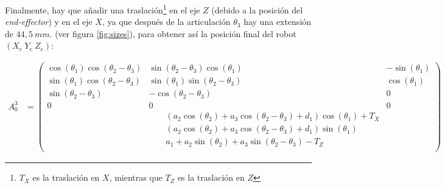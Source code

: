 \documentclass[a4paper,12pt]{article}
\begin{document}
Finalmente, hay que añadir una traslación\footnote{$T_X$ es la traslación en $X$, mientras que $T_Z$ es la traslación en $Z$} en el eje $Z$ (debido a la posición del \textit{end-effector})
y en el eje $X$, ya que después de la articulación $\theta_3$ hay una extensión de $44,5~mm.$ (ver figura \ref{fig:sizes}),
para obtener así la posición final del robot $(X_e ~ Y_e ~ Z_e)$:

{\footnotesize\begin{align}
    A_0^3 & =
    \begin{pmatrix}
        \cos{\left(\theta_{1} \right)} \cos{\left(\theta_{2} - \theta_{3} \right)} & \sin{\left(\theta_{2} - \theta_{3} \right)} \cos{\left(\theta_{1} \right)}                                                                                & - \sin{\left(\theta_{1} \right)} \\
        \sin{\left(\theta_{1} \right)} \cos{\left(\theta_{2} - \theta_{3} \right)} & \sin{\left(\theta_{1} \right)} \sin{\left(\theta_{2} - \theta_{3} \right)}                                                                                & \cos{\left(\theta_{1} \right)}   \\
        \sin{\left(\theta_{2} - \theta_{3} \right)}                                & - \cos{\left(\theta_{2} - \theta_{3} \right)}                                                                                                             & 0                                \\
        0                                                                          & 0                                                                                                                                                         & 0                                \\
                                                                                   & \qquad \left(a_{2} \cos{\left(\theta_{2} \right)} + a_{3} \cos{\left(\theta_{2} - \theta_{3} \right)} + d_{1}\right) \cos{\left(\theta_{1} \right)} + T_X                                    \\
                                                                                   & \qquad \left(a_{2} \cos{\left(\theta_{2} \right)} + a_{3} \cos{\left(\theta_{2} - \theta_{3} \right)} + d_{1}\right) \sin{\left(\theta_{1} \right)}                                          \\
                                                                                   & \qquad a_{1} + a_{2} \sin{\left(\theta_{2} \right)} + a_{3} \sin{\left(\theta_{2} - \theta_{3} \right)} - T_{Z}                                                                              \\

\end{pmatrix}
\end{align}}
\end{document}
